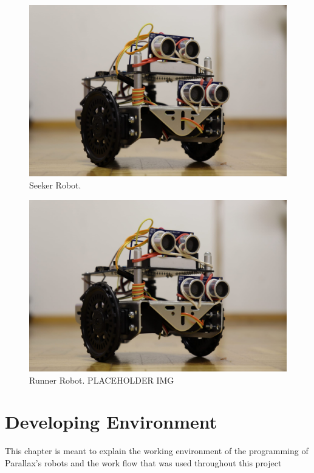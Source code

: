 \documentclass[sigconf,nonacm]{acmart}
\begin{document}
\begin{figure}[h]
    \centering
    \includegraphics[scale=0.1]{resources/Seeker_robot/4.jpeg}
    \caption{\label{fig:Seeker}Seeker Robot.}
\end{figure}

\begin{figure}[h]
    \centering
    \includegraphics[scale=0.1]{resources/Seeker_robot/4.jpeg}
    \caption{\label{fig:Runner}Runner Robot. PLACEHOLDER IMG}
\end{figure}

\section{Developing Environment}

      This chapter is meant to explain the working environment of the
      programming
      of Parallax's robots and the work flow that was used throughout this
      project
      
\end{document}
